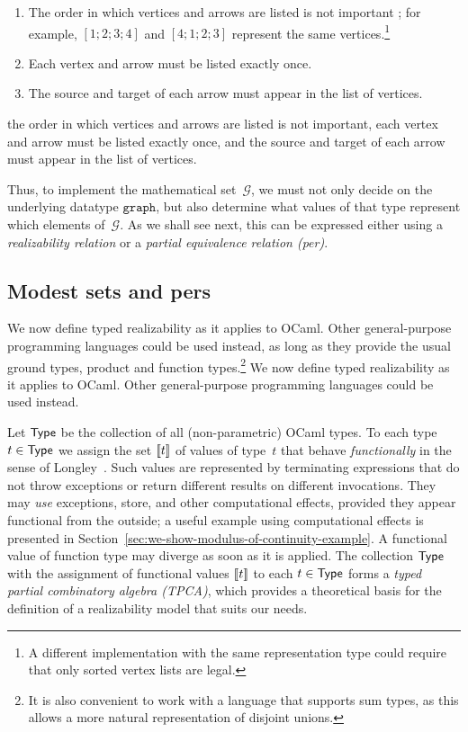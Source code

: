 %
\iflong
\begin{enumerate}
\item The order in which vertices and arrows are listed is not
  important%
; for example, $[1;2;3;4]$ and $[4;1;2;3]$ represent the same vertices.\footnote{
  A different implementation with the same representation type could require
  that only sorted vertex lists are legal.}
\item Each vertex and arrow must be listed exactly once.
\item The source and target of each arrow must appear in the list of vertices.
\end{enumerate}
\else %
the order in which vertices and arrows are listed is not
important, each vertex and arrow must be listed exactly once, and
the source and target of each arrow must appear in the list of vertices.
\fi %

%
Thus, to implement the mathematical set~$\mathcal{G}$, we must not
only decide on the underlying datatype $\mathtt{graph}$, but also
determine what values of that type represent which elements
of~$\mathcal{G}$. As we shall see next, this can be expressed either
using a \emph{realizability relation} or a \emph{partial equivalence
  relation (per)}.


\subsection{Modest sets and pers}
\label{sec:modest-sets-pers}

\iflong
We now define typed realizability as it
applies to OCaml. Other general-purpose programming languages could be
used instead, as long as they provide the usual ground types, product
and function types.\footnote{It is also convenient to work with a
language that supports sum types, as this allows a more natural
representation of disjoint unions.}
\else
We now define typed realizability as it
applies to OCaml. Other general-purpose programming languages could be
used instead.
\fi %

Let $\mathsf{Type}$ be the collection of all (non-parametric) OCaml types. To
each type $t \in \mathsf{Type}$ we assign the set $[\![t]\!]$ of values of
type~$t$ that behave \emph{functionally} in the sense of
Longley~\cite{longley99when}. Such values are represented by
terminating expressions that do not throw exceptions or return
different results on different invocations. They may \emph{use}
exceptions, store, and other computational effects, provided they
appear functional from the outside; a useful example using
computational effects is presented in
Section~\ref{sec:we-show-modulus-of-continuity-example}. A functional
value of function type may diverge as soon as it is applied. The
collection $\mathsf{Type}$ with the assignment of functional values
$[\![t]\!]$ to each $t \in \mathsf{Type}$ forms a \emph{typed partial
  combinatory algebra (TPCA)}, which provides a theoretical basis for
the definition of a realizability model that suits our needs.

